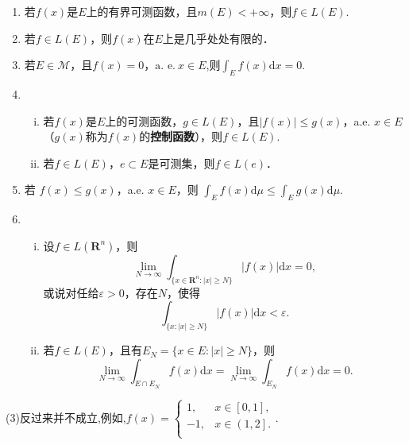 \documentclass[../../main.tex]{subfiles}
\begin{document}
\begin{theorem}[积分的基本性质]\label{theorem:积分的基本性质}
\begin{enumerate}[(1)]
\item  若\(f(x)\)是\(E\)上的有界可测函数，且\(m(E) < +\infty\)，则$f \in L(E).$

\item  若\(f \in L(E)\)，则\(f(x)\)在\(E\)上是几乎处处有限的．

\item  若\(E \in \mathscr{M}\)，且\(f(x) = 0\)，\(\text{a. e.}\ x \in E\),则$\int_E f(x) \mathrm{d}x = 0.$

\item \begin{enumerate}[(i)]
\item 若\(f(x)\)是\(E\)上的可测函数，\(g \in L(E)\)，且\(|f(x)| \leqslant g(x)\)，a.e. \(x \in E\)（\(g(x)\)称为\(f(x)\)的\textbf{控制函数}），则\(f \in L(E)\).

\item 若\(f \in L(E)\)，\(e \subset E\)是可测集，则\(f \in L(e)\)．
\end{enumerate}

\item 若 \( f(x) \leqslant g(x) \)，a.e. \( x \in E \)，则 \( \int_E f(x)\mathrm{d}\mu \leqslant \int_E g(x)\mathrm{d}\mu \).

\item \begin{enumerate}[(i)]
\item 设\(f \in L(\mathbf{R}^n)\)，则
\[
\lim_{N \to \infty} \int_{\{x \in \mathbf{R}^n: |x| \geqslant N\}} |f(x)| \mathrm{d}x = 0,
\]
或说对任给\(\varepsilon > 0\)，存在\(N\)，使得
\[
\int_{\{x: |x| \geqslant N\}} |f(x)| \mathrm{d}x < \varepsilon.
\]

\item 若\(f \in L(E)\)，且有\(E_N = \{x \in E: |x| \geqslant N\}\)，则
\[
\lim_{N \to \infty} \int_{E \cap E_N} f(x) \mathrm{d}x =\lim_{N \to \infty} \int_{E_N} f(x) \mathrm{d}x = 0.
\]
\end{enumerate}
\end{enumerate}
\end{theorem}
\begin{remark}
(3)反过来并不成立,例如,$f\left( x \right) =\begin{cases}
1,&x\in \left[ 0,1 \right] ,\\
-1,&x\in \left( 1,2 \right] .\\
\end{cases}.$
\end{remark}
\end{document}
